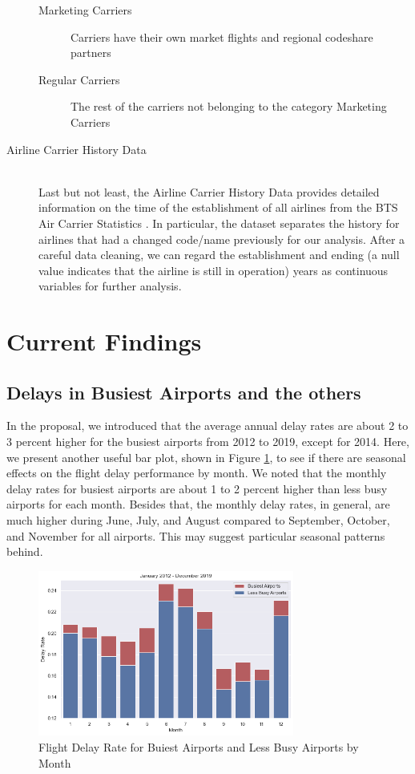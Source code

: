 \documentclass[11pt, letterpaper]{article}
\begin{document}
\begin{description}
  \begin{description}
  \item[Marketing Carriers] Carriers have their own market flights and regional codeshare partners
  \item[Regular Carriers] The rest of the carriers not belonging to the category Marketing Carriers
  \end{description}
  \item[Airline Carrier History Data] \hfill \\ Last but not least, the Airline Carrier History Data provides detailed information on the time of the establishment of all airlines from the BTS Air Carrier Statistics \cite{web:bts3}. In particular, the dataset separates the history for airlines that had a changed code/name previously for our analysis. After a careful data cleaning, we can regard the establishment and ending (a null value indicates that the airline is still in operation) years as continuous variables for further analysis.
\end{description}

\section{Current Findings}\label{sec:findings}
\subsection{Delays in Busiest Airports and the others}
In the proposal, we introduced that the average annual delay rates are about 2 to 3 percent higher for the busiest airports from 2012 to 2019, except for 2014. Here, we present another useful bar plot, shown in Figure \ref{fig:bar_plot}, to see if there are seasonal effects on the flight delay performance by month. We noted that the monthly delay rates for busiest airports are about 1 to 2 percent higher than less busy airports for each month. Besides that, the monthly delay rates, in general, are much higher during June, July, and August compared to September, October, and November for all airports. This may suggest particular seasonal patterns behind.

\begin{figure}[h!]
\centering
\includegraphics[width = 0.75\textwidth]{bar_plot}
\caption{Flight Delay Rate for Buiest Airports and Less Busy Airports by Month}\label{fig:bar_plot}
\end{figure}
\end{document}
